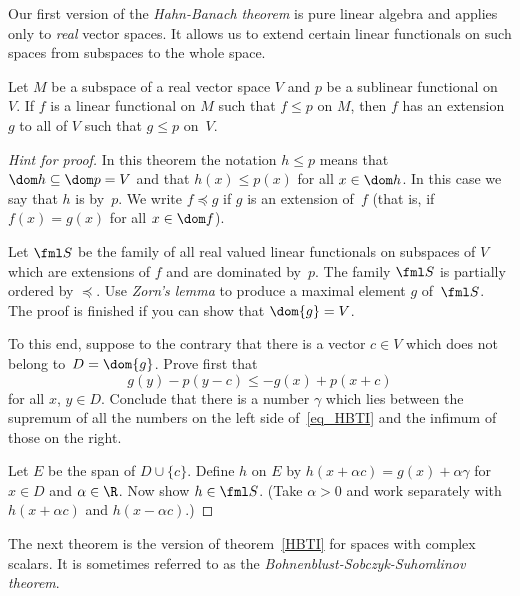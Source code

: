 Our first version of the \emph{Hahn-Banach theorem} is pure linear algebra and applies only to \emph{real} vector spaces.
It allows us to extend certain linear functionals on such spaces from subspaces to the whole space.

\begin{thm}\label{HBTI} Let $M$ be a subspace of a real vector space $V$ and $p$
be a sublinear functional on~$V$. If $f$ is a linear functional on $M$ such that $f \le p$ on $M$, then
$f$ has an extension $g$ to all of $V$ such that $g \le p$ on~$V$.
\end{thm}

\begin{proof}[\emph{Hint for proof}] In this theorem the notation $h \le p$ means that $\dom h \subseteq \dom p = V$
and that $h(x) \le p(x)$ for all $x \in \dom h$.  In this case we say that $h$ is
 by~$p$.  We write
$f \preccurlyeq g$ if $g$ is an extension of~$f$ (that is,
if $f(x) = g(x)$ for all $x \in \dom f$).

Let $\fml S$ be the family of all real valued linear functionals on subspaces of $V$ which are extensions of $f$ and are
dominated by~$p$. The family $\fml S$ is partially ordered by $\preccurlyeq$.  Use \emph{Zorn's lemma} to produce a
maximal element $g$ of~$\fml S$.  The proof is finished if you can show that $\dom{g} = V$.

To this end, suppose to the contrary that there is a vector $c \in V$ which does not belong to~$D = \dom{g}$.  Prove first that
   \begin{equation}\label{eq_HBTI}
      g(y) - p(y - c) \le - g(x) + p(x + c)
   \end{equation}
for all $x$, $y \in D$.  Conclude that there is a number $\gamma$ which lies between the supremum of all the numbers
on the left side of~\eqref{eq_HBTI} and the infimum of those on the right.

Let $E$ be the span of $D \cup \{c\}$.  Define $h$ on $E$ by $h(x + \alpha c) = g(x) + \alpha\gamma$ for $x \in D$ and
$\alpha \in \R$.  Now show $h \in \fml S$.  (Take $\alpha > 0$ and work separately with $h(x + \alpha c)$ and $h(x - \alpha c)$.) \ns
\end{proof}

The next theorem is the version of theorem~\ref{HBTI} for spaces with complex scalars.  It is sometimes referred to as the
\emph{Bohnenblust-Sobczyk-Suhomlinov theorem}.

